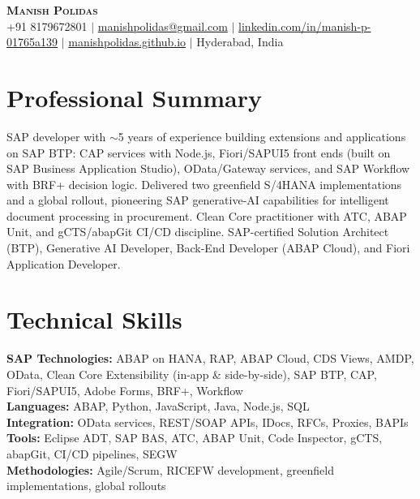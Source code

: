 \documentclass[letterpaper,11pt]{article}
\begin{document}
\begin{center}
    \textbf{\Huge \scshape Manish Polidas} \\ \vspace{1pt}
    \small +91 8179672801 $|$ \href{mailto:manishpolidas@gmail.com}{manishpolidas@gmail.com} $|$
    \href{https://www.linkedin.com/in/manish-p-01765a139/}{linkedin.com/in/manish-p-01765a139} $|$
    \href{https://manishpolidas.github.io}{manishpolidas.github.io} $|$ Hyderabad, India
\end{center}

\section{Professional Summary}
SAP developer with $\sim$5 years of experience building extensions and applications on SAP BTP: CAP services with Node.js, Fiori/SAPUI5 front ends (built on SAP Business Application Studio), OData/Gateway services, and SAP Workflow with BRF+ decision logic. Delivered two greenfield S/4HANA implementations and a global rollout, pioneering SAP generative-AI capabilities for intelligent document processing in procurement. Clean Core practitioner with ATC, ABAP Unit, and gCTS/abapGit CI/CD discipline. SAP-certified Solution Architect (BTP), Generative AI Developer, Back-End Developer (ABAP Cloud), and Fiori Application Developer.

\section{Technical Skills}
 \begin{itemize}[leftmargin=0.15in, label={}]
    \small{\item{
     \textbf{SAP Technologies:} ABAP on HANA, RAP, ABAP Cloud, CDS Views, AMDP, OData, Clean Core Extensibility (in-app \& side-by-side), SAP BTP, CAP, Fiori/SAPUI5, Adobe Forms, BRF+, Workflow \\
     \textbf{Languages:} ABAP, Python, JavaScript, Java, Node.js, SQL \\
     \textbf{Integration:} OData services, REST/SOAP APIs, IDocs, RFCs, Proxies, BAPIs \\
     \textbf{Tools:} Eclipse ADT, SAP BAS, ATC, ABAP Unit, Code Inspector, gCTS, abapGit, CI/CD pipelines, SEGW \\
     \textbf{Methodologies:} Agile/Scrum, RICEFW development, greenfield implementations, global rollouts \\
    }}
 \end{itemize}
\end{document}
